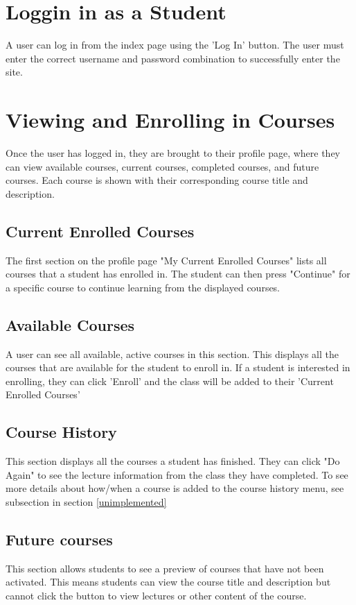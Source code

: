 \documentclass[12pt]{article}
\begin{document}
\section{Loggin in as a Student}
A user can log in from the index page using the 'Log In' button. The user must enter the correct username and password combination to successfully enter the site.
\section{Viewing and Enrolling in Courses}
Once the user has logged in, they are brought to their profile page, where they can view available courses, current courses, completed courses, and future courses. Each course is shown with their corresponding course title and description.
\subsection{Current Enrolled Courses}
The first section on the profile page "My Current Enrolled Courses" lists all courses that a student has enrolled in. The student can then press "Continue" for a specific course to continue learning from the displayed courses.
\subsection{Available Courses}
A user can see all available, active courses in this section. This displays all the courses that are available for the student to enroll in. If a student is interested in enrolling, they can click 'Enroll' and the class will be added to their 'Current Enrolled Courses'
\subsection{Course History}
This section displays all the courses a student has finished. They can click "Do Again" to see the lecture information from the class they have completed. To see more details about how/when a course is added to the course history menu, see subsection in section \ref{unimplemented}
\subsection{Future courses}
This section allows students to see a preview of courses that have not been activated. This means students can view the course title and description but cannot click the button to view lectures or other content of the course.
\end{document}
